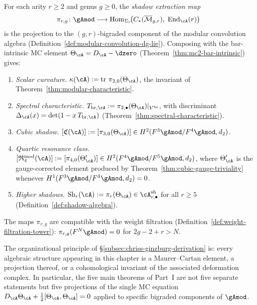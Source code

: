 \begin{construction}
\label{constr:shadow-extraction-explicit}
\ClaimStatusProvedHere
{}
For each arity $r \geq 2$ and genus $g \geq 0$, the
\emph{shadow extraction map}
\begin{equation}\label{eq:shadow-extraction-map}
\pi_{r,g} \colon \gAmod
\longrightarrow
\operatorname{Hom}_{\Sigma_r}\!\bigl(
C_*(\overline{\mathcal{M}}_{g,r}),\;
\operatorname{End}_\cA(r)
\bigr)
\end{equation}
is the projection to the $(g,r)$-bigraded component of the
modular convolution algebra
(Definition~\ref{def:modular-convolution-dg-lie}).
Composing with the bar-intrinsic MC element
$\Theta_\cA = D_\cA - \dzero$
(Theorem~\ref{thm:mc2-bar-intrinsic}) gives:
\begin{enumerate}[label=\textup{(\roman*)}]
\item \emph{Scalar curvature.}
  $\kappa(\cA) := \operatorname{tr}\,\pi_{2,0}(\Theta_\cA)$,
  the invariant of Theorem~\ref{thm:modular-characteristic}.
\item \emph{Spectral characteristic.}
  $T_{\mathrm{br},\cA} := \pi_{2,\bullet}(\Theta_\cA)|_{V^{\mathrm{br}}}$,
  with discriminant
  $\Delta_\cA(x) = \det(1 - x\, T_{\mathrm{br},\cA})$
  (Theorem~\ref{thm:spectral-characteristic}).
\item \emph{Cubic shadow.}
  $[\mathfrak{C}(\cA)] := [\pi_{3,0}(\Theta_\cA)]
  \in H^2(F^3\gAmod / F^4\gAmod, d_2)$.
\item \emph{Quartic resonance class.}
  $[\mathfrak{R}_4^{\mathrm{mod}}(\cA)]
  := [\pi_{4,0}(\Theta'_\cA)]
  \in H^2(F^4\gAmod / F^5\gAmod, d_2)$,
  where $\Theta'_\cA$ is the gauge-corrected element
  produced by Theorem~\ref{thm:cubic-gauge-triviality}
  whenever $H^1(F^3\gAmod / F^4\gAmod, d_2) = 0$.
\item \emph{Higher shadows.}
  $\operatorname{Sh}_r(\cA) := \pi_r(\Theta_\cA)
  \in \cA^{\mathrm{sh}}_{r,\bullet}$
  for all $r \geq 5$
  (Definition~\ref{def:shadow-algebra}).
\end{enumerate}
The maps $\pi_{r,g}$ are compatible with the weight filtration
(Definition~\ref{def:weight-filtration-tower}):
$\pi_{r,g}(F^N\gAmod) = 0$ for $2g - 2 + r > N$.
\end{construction}

\begin{remark}
\label{rem:chriss-ginzburg-naming}
The organizational principle of \S\ref{subsec:chriss-ginzburg-derivation}
is: every algebraic structure appearing in this chapter is a
Maurer--Cartan element, a projection thereof, or a cohomological
invariant of the associated deformation complex.  In particular,
the five main theorems of Part~I are not five separate statements
but five projections of the single MC equation
$D_\cA \Theta_\cA + \tfrac{1}{2}[\Theta_\cA, \Theta_\cA] = 0$
applied to specific bigraded components of $\gAmod$.
\end{remark}

